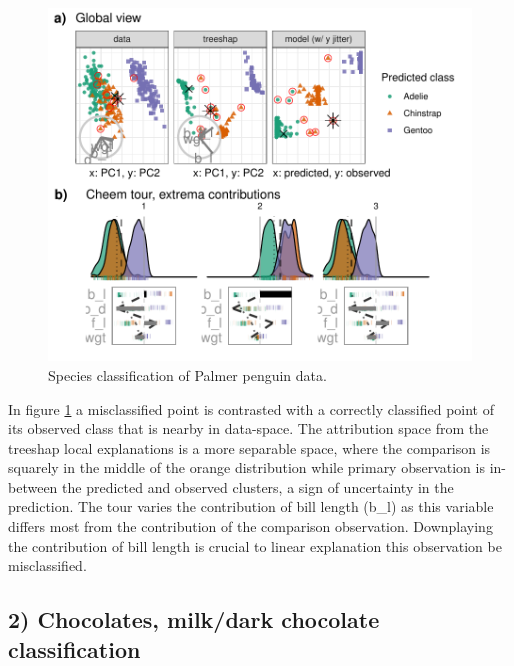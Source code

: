 \documentclass[
]{article}
\begin{document}
\begin{figure}

{\centering \includegraphics[width=1\linewidth]{./figures/case_penguins} 

}

\caption{Species classification of Palmer penguin data.}\label{fig:casepenguins}
\end{figure}

In figure \ref{fig:casepenguins} a misclassified point is contrasted with a correctly classified point of its observed class that is nearby in data-space. The attribution space from the treeshap local explanations is a more separable space, where the comparison is squarely in the middle of the orange distribution while primary observation is in-between the predicted and observed clusters, a sign of uncertainty in the prediction. The tour varies the contribution of bill length (b\_l) as this variable differs most from the contribution of the comparison observation. Downplaying the contribution of bill length is crucial to linear explanation this observation be misclassified.

\hypertarget{chocolates-milkdark-chocolate-classification}{%
\subsection{2) Chocolates, milk/dark chocolate classification}\label{chocolates-milkdark-chocolate-classification}}
\end{document}

